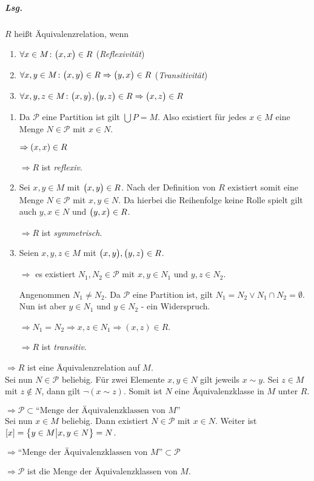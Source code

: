 \documentclass{scrreprt}
\begin{document}
\subparagraph{Lsg.} $R$ heißt Äquivalenzrelation, wenn
\begin{enumerate}[(1)]
\item $\forall x \in M \colon \qty\big(x, x) \in R$ (\emph{Reflexivität})
\item $\forall x, y \in M \colon \qty\big(x, y) \in R
  \Rightarrow \qty\big(y, x) \in R$ (\emph{Transitivität})

\item $\forall x, y, z \in M \colon \qty\big(x, y), \qty\big(y, z) \in R
  \Rightarrow \qty\big(x, z) \in R$
\end{enumerate}

\begin{enumerate}[label={Zu (\arabic*)}]
\item Da $\mathcal{P}$ eine Partition ist gilt $\bigcup P = M$.
  Also existiert für jedes $x \in M$ eine Menge $N \in \mathcal{P}$
  mit $x \in N$.

  $\Rightarrow \qty(x, x) \in R$

  $\Rightarrow R$ ist \emph{reflexiv}.

\item Sei $x, y \in M$ mit $\qty\big(x, y) \in R$.
  Nach der Definition von $R$ existiert somit eine Menge $N \in \mathcal{P}$
  mit $x, y \in N$.
  Da hierbei die Reihenfolge keine Rolle spielt gilt auch $y, x \in N$ und
  $\qty\big(y, x) \in R$.

  $\Rightarrow R$ ist \emph{symmetrisch}.

\item Seien $x, y, z \in M$ mit $\qty\big(x, y), \qty\big(y, z) \in R$.

  $\Rightarrow$ es existiert $N_1, N_2 \in \mathcal{P}$ mit $x, y \in N_1$
  und $y, z \in N_2$.

  Angenommen $N_1 \ne N_2$.
  Da $\mathcal{P}$ eine Partition ist, gilt $N_1 = N_2 \lor N_1 \cap N_2 = \emptyset$.
  Nun ist aber $y \in N_1$ und $y \in N_2$ - ein Widerspruch.

  $\Rightarrow N_1 = N_2 \Rightarrow x, z \in N_1 \Rightarrow (x, z) \in R$.

  $\Rightarrow R$ ist \emph{transitiv}.
\end{enumerate}

$\Rightarrow R$ ist eine Äquivalenzrelation auf $M$. \\

\noindent
Sei nun $N \in \mathcal{P}$ beliebig.
Für zwei Elemente $x, y \in N$ gilt jeweils $x \sim y$.
Sei $z \in M$ mit $z \notin N$, dann gilt $\neg (x \sim z)$.
Somit ist $N$ eine Äquivalenzklasse in $M$ unter $R$.

$\Rightarrow \mathcal{P} \subset \text{``Menge der Äquivalenzklassen von $M$''}$
\\

\noindent
Sei nun $x \in M$ beliebig.
Dann existiert $N \in \mathcal{P}$ mit $x \in N$.
Weiter ist $\qty[x] = \qty\big{y \in M {\big |} x, y \in N} = N$.

$\Rightarrow \text{``Menge der Äquivalenzklassen von $M$''} \subset \mathcal{P}$

$\Rightarrow \mathcal{P}$ ist die Menge der Äquivalenzklassen von $M$.
\end{document}
